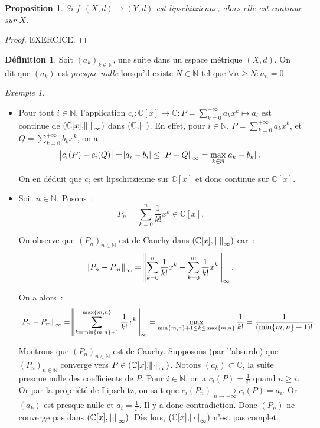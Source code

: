 \documentclass{report}
\newtheorem{prp}[thm]{Proposition}
\theoremstyle{definition}
\newtheorem{déf}[thm]{Définition}
\theoremstyle{remark}
\newtheorem{ex}{Exemple}[chapter]
\numberwithin{equation}{section}
\newcommand{\C}{\mathbb C}
\newcommand{\N}{\mathbb N}
\newcommand{\seq}[3]{\left(#1_{#2}\right)_{#2 \in #3}}
\newcommand{\mconv}[3]{\xrightarrow[#1 \to #2]{#3}}
\newcommand{\pinfty}{{+\infty}}
\begin{document}
				\begin{prp} Si $f : (X, d) \to (Y, d)$ est lipschitzienne, alors elle est continue sur $X$. \end{prp}

				\begin{proof} EXERCICE.
				\end{proof}

				\begin{déf} Soit $\seq ak\N$, une suite dans un espace métrique $(X, d)$. On dit que $(a_k)$ est \textit{presque nulle} lorsqu'il existe
				$N \in \N$ tel que $\forall n \geq N : a_n = 0$. \end{déf}

				\begin{ex}~
				\begin{itemize}
					\item Pour tout $i \in \N$, l'application $c_i : \C[x] \to \C : P = \sum_{k=0}^\pinfty a_kx^k \mapsto a_i$ est continue de
						  $(\C[x], \norm \cdot_\infty)$ dans $(\C, \abs \cdot)$. En effet, pour $i \in \N$, $P = \sum_{k=0}^\pinfty a_kx^k$, et
						  $Q = \sum_{k=0}^\pinfty b_kx^k$, on a~:
						  \begin{equation}
							\abs{c_i(P) - c_i(Q)} = \abs{a_i - b_i} \leq \norm{P-Q}_\infty = \max_{k \in \N}\abs{a_k - b_k}.
						\end{equation}

						  On en déduit que $c_i$ est lipschitzienne sur $\C[x]$ et donc continue sur $\C[x]$.
					\item Soit $n \in \N$. Posons~:
						  \begin{equation}
							P_n = \sum_{k=0}^n\frac 1{k!}x^k \in \C[x].
						\end{equation}

						  On observe que $\seq Pn\N$ est de Cauchy dans $(\C[x], \norm \cdot_\infty)$ car~:
						  \begin{equation}
							\norm{P_n - P_m}_\infty = \norm{\sum_{k=0}^n\frac 1{k!}x^k - \sum_{k=0}^m\frac 1{k!}x^k}_\infty.
						\end{equation}

						  On a alors~:
						  \begin{equation}
							\norm{P_n - P_m}_\infty = \norm {\sum_{k=\min\{m, n\}+1}^{\max\{m, n\}}\frac 1{k!}x^k}_\infty =
						  	\max_{\min\{m, n\}+1 \leq k \leq \max\{m, n\}}\frac 1{k!} = \frac 1{(\min\{m, n\}+1)!}.
						\end{equation}

						  Montrons que $\seq Pn\N$ est de Cauchy. Supposons (par l'absurde) que $\seq Pn\N$ converge vers $P \in (\C[x], \norm \cdot_\infty)$.
						  Notons $(a_k) \subset \C$, la suite presque nulle des coefficients de $P$. Pour $i \in \N$, on a $c_i(P) = \frac 1{i!}$ quand
						  $n \geq i$. Or par la propriété de Lipschitz, on sait que $c_i(P_n) \mconv n\pinfty{} c_i(P) = a_i$. Or $(a_k)$ est presque nulle et
						  $a_i = \frac 1{i!}$. Il y a donc contradiction. Donc $(P_n)$ ne converge pas dans $(\C[x], \norm \cdot_\infty)$. Dès lors,
						  $(\C[x], \norm \cdot_\infty)$ n'est pas complet.
				\end{itemize}
				\end{ex}
\end{document}

